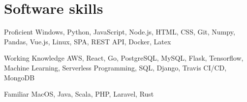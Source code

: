 \documentclass{tccv}
\begin{document}
\section{Software skills}

\begin{factlist}

\item{Proficient}
     {Windows, Python, JavaScript, Node.js, HTML, CSS, Git, Numpy, Pandas, Vue.js, Linux, SPA, REST API, Docker, Latex}

\item{Working Knowledge}
     {AWS, React, Go, PostgreSQL, MySQL, Flask, Tensorflow, Machine Learning, Serverless Programming, SQL, Django, Travis CI/CD, MongoDB}

\item{Familiar}
     {MacOS, Java, Scala, PHP, Laravel, Rust}

\end{factlist}
\end{document}
